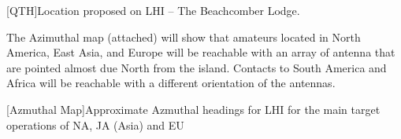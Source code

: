 \documentclass[11pt]{article}
\begin{document}
\noindent%
\begin{minipage}{\linewidth}%
\captionsetup{width=0.8\linewidth}
[QTH]{Location proposed on LHI -- The Beachcomber Lodge.}
\label{location-relative-qth}
\end{minipage}
\vskip3mm


The Azimuthal map (attached) will show that amateurs located in North America,
East Asia, and Europe will be reachable with an array of antenna that are pointed almost due North from the island.  Contacts to South America and Africa will
be reachable with a different orientation of the antennas.

\vskip2mm
\noindent%
\begin{minipage}{\linewidth}%
\captionsetup{width=0.8\linewidth}
[Azmuthal Map]{Approximate Azmuthal headings for LHI
for the main target operations of NA, JA (Asia) and EU}
\label{azim}
\end{minipage}
\vskip3mm
\end{document}
